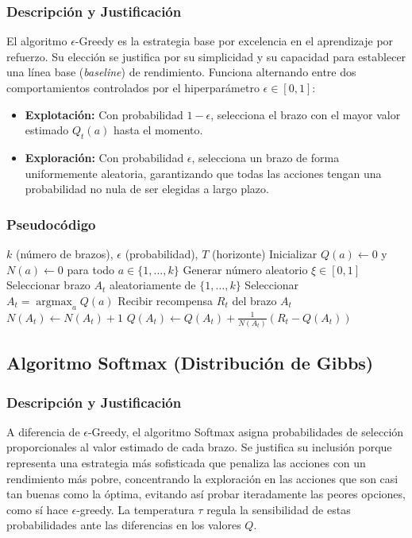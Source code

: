 \subsubsection{Descripción y Justificación}
El algoritmo $\epsilon$-Greedy es la estrategia base por excelencia en el aprendizaje por refuerzo. Su elección se justifica por su simplicidad y su capacidad para establecer una línea base (\textit{baseline}) de rendimiento. Funciona alternando entre dos comportamientos controlados por el hiperparámetro $\epsilon \in [0, 1]$:
\begin{itemize}
    \item \textbf{Explotación:} Con probabilidad $1-\epsilon$, selecciona el brazo con el mayor valor estimado $Q_t(a)$ hasta el momento.
    \item \textbf{Exploración:} Con probabilidad $\epsilon$, selecciona un brazo de forma uniformemente aleatoria, garantizando que todas las acciones tengan una probabilidad no nula de ser elegidas a largo plazo.
\end{itemize}

\subsubsection{Pseudocódigo}
\begin{algorithm}[H]
\caption{Algoritmo $\epsilon$-Greedy}
\begin{algorithmic}[1] 
\small
\Require $k$ (número de brazos), $\epsilon$ (probabilidad), $T$ (horizonte)
\State Inicializar $Q(a) \gets 0$ y $N(a) \gets 0$ para todo $a \in \{1, \dots, k\}$
    \State Generar número aleatorio $\xi \in [0, 1]$
    \If{$\xi < \epsilon$}
        \State Seleccionar brazo $A_t$ aleatoriamente de $\{1, \dots, k\}$
    \Else
        \State Seleccionar $A_t = \operatorname{argmax}_a Q(a)$
    \EndIf
    \State Recibir recompensa $R_t$ del brazo $A_t$
    \State $N(A_t) \gets N(A_t) + 1$
    \State $Q(A_t) \gets Q(A_t) + \frac{1}{N(A_t)} (R_t - Q(A_t))$
\EndFor
\end{algorithmic}
\end{algorithm}

\subsection{Algoritmo Softmax (Distribución de Gibbs)}

\subsubsection{Descripción y Justificación}
A diferencia de $\epsilon$-Greedy, el algoritmo Softmax asigna probabilidades de selección 
proporcionales al valor estimado de cada brazo. Se justifica su inclusión porque representa 
una estrategia más sofisticada que penaliza las acciones con un rendimiento más pobre, concentrando 
la exploración en las acciones que son casi tan buenas como la óptima, evitando así probar 
iteradamente las peores opciones, como sí hace $\epsilon$-greedy. La temperatura $\tau$ regula la sensibilidad de estas 
probabilidades ante las diferencias en los valores $Q$.

